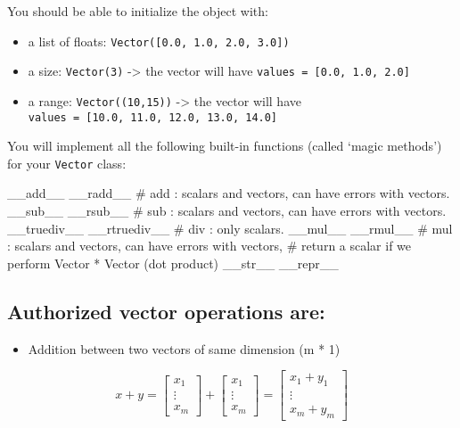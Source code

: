 \documentclass[]{article}
\newenvironment{Shaded}{\begin{snugshade}}{\end{snugshade}}
\newcommand{\CommentTok}[1]{\textcolor[rgb]{0.48,0.49,0.49}{#1}}
\newcommand{\FunctionTok}[1]{\textcolor[rgb]{0.56,0.27,0.68}{#1}}
\providecommand{\tightlist}{%
  \setlength{\itemsep}{0pt}\setlength{\parskip}{0pt}}
\begin{document}
You should be able to initialize the object with:

\begin{itemize}
\item
  a list of floats: \texttt{Vector({[}0.0,\ 1.0,\ 2.0,\ 3.0{]})}
\item
  a size: \texttt{Vector(3)} -\textgreater{} the vector will have
  \texttt{values\ =\ {[}0.0,\ 1.0,\ 2.0{]}}
\item
  a range: \texttt{Vector((10,15))} -\textgreater{} the vector will have
  \texttt{values\ =\ {[}10.0,\ 11.0,\ 12.0,\ 13.0,\ 14.0{]}}
\end{itemize}

You will implement all the following built-in functions (called `magic
methods') for your \texttt{Vector} class:

\begin{Shaded}
\begin{Highlighting}[]
    \FunctionTok{__add__}
    \FunctionTok{__radd__}
    \CommentTok{# add : scalars and vectors, can have errors with vectors.}
    \FunctionTok{__sub__}
    \FunctionTok{__rsub__}
    \CommentTok{# sub : scalars and vectors, can have errors with vectors.}
    \FunctionTok{__truediv__}
    \FunctionTok{__rtruediv__}
    \CommentTok{# div : only scalars.}
    \FunctionTok{__mul__}
    \FunctionTok{__rmul__}
    \CommentTok{# mul : scalars and vectors, can have errors with vectors, }
    \CommentTok{# return a scalar if we perform Vector * Vector (dot product)}
    \FunctionTok{__str__}
    \FunctionTok{__repr__}
\end{Highlighting}
\end{Shaded}

\hypertarget{authorized-vector-operations-are}{%
\subsection{Authorized vector operations
are:}\label{authorized-vector-operations-are}}

\begin{itemize}
\tightlist
\item
  Addition between two vectors of same dimension (m * 1)
\end{itemize}

\large

\[
x + y = 
\begin{bmatrix} x_1 \\ \vdots \\ x_m\end{bmatrix} + 
\begin{bmatrix} x_1 \\ \vdots \\ x_m\end{bmatrix} 
= \begin{bmatrix} x_1 + y_1 \\ \vdots \\ x_m + y_m \end{bmatrix}
\] \normalsize
\end{document}
